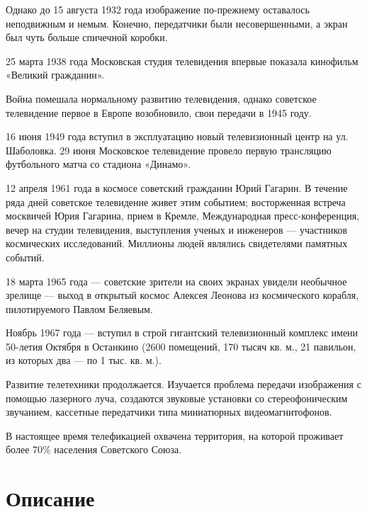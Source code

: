 \documentclass[12pt, a4paper, openany]{book}
\begin{document}
Однако до 15 августа 1932 года изображение по-прежнему оставалось неподвижным и немым. Конечно, передатчики были несовершенными, а экран был чуть больше спичечной коробки. 

25 марта 1938 года Московская студия телевидения впервые показала кинофильм «Великий гражданин». 

Война помешала нормальному развитию телевидения, однако советское телевидение первое в Европе возобновило, свои передачи в 1945 году. 

16 июня 1949 года вступил в эксплуатацию новый телевизионный центр на ул. Шаболовка. 29 июня Московское телевидение провело первую трансляцию футбольного матча со стадиона «Динамо». 

12 апреля 1961 года в космосе советский гражданин Юрий Гагарин. В течение ряда дней советское телевидение живет этим событием; восторженная встреча москвичей Юрия Гагарина, прием в Кремле, Международная пресс-конференция, вечер на студии телевидения, выступления ученых и инженеров — участников космических исследований. Миллионы людей являлись свидетелями памятных событий. 

18 марта 1965 года — советские зрители на своих экранах увидели необычное зрелище — выход в открытый космос Алексея Леонова из космического корабля, пилотируемого Павлом Беляевым. 

Ноябрь 1967 года — вступил в строй гигантский телевизионный комплекс имени 50-летия Октября в Останкино (2600 помещений, 170 тысяч кв. м., 21 павильон, из которых два — по 1 тыс. кв. м.). 

Развитие телетехники продолжается. Изучается проблема передачи изображения с помощью лазерного луча, создаются звуковые установки со стереофоническим звучанием, кассетные передатчики типа миниатюрных видеомагнитофонов. 

В настоящее время телефикацией охвачена территория, на которой проживает более 70\% населения Советского Союза. 




	
	
	\newpage
	\tableofcontents
	
	\thispagestyle{empty} %
	
	\newpage
	
	\setcounter{secnumdepth}{0}
	
	
		\section*{Описание}
	
\end{document}
